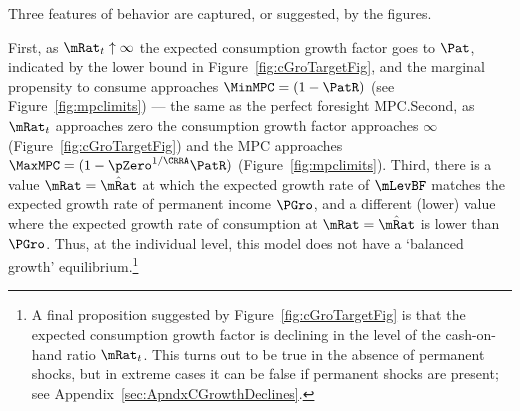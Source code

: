 \documentclass[BufferStockTheory]{subfiles}
\begin{document}
Three features of behavior are captured, or suggested, by the figures.

First, as $\mRat_{t} \uparrow \infty$ the expected consumption growth factor goes to ${\Pat}$, indicated by the lower bound in Figure~\ref{fig:cGroTargetFig}, and the marginal propensity to consume approaches $\MinMPC=(1-\PatR)$ (see Figure~\ref{fig:mpclimits}) --- the same as the perfect foresight MPC.\@  Second, as $\mRat_{t}$ approaches zero the consumption growth factor approaches $\infty$ (Figure~\ref{fig:cGroTargetFig}) and the MPC approaches $\MaxMPC=(1-\pZero^{1/\CRRA}\PatR)$ (Figure~\ref{fig:mpclimits}).  Third, there is a value $\mRat = \hat{\mRat}$ at which the expected growth rate of $\mLevBF$ matches the expected growth rate of permanent income $\PGro$, and a different (lower) value where the expected growth rate of consumption at $\mRat = \hat{\mRat}$ is lower than $\PGro$.  Thus, at the individual level, this model does not have a `balanced growth' equilibrium.\footnote{A final proposition suggested by Figure~\ref{fig:cGroTargetFig} is that the expected consumption growth factor is declining in the level of the cash-on-hand ratio $\mRat_{t}$.  This turns out to be true in the absence of permanent shocks, but in extreme cases it can be false if permanent shocks are present; see Appendix~\ref{sec:ApndxCGrowthDeclines}.}

\begin{comment}
  Third (Figure~\ref{fig:cGroTargetFig}), there are two special values of $\mRat$, which we will call the `individual balanced growth' point $\mStE$ because it is the point where expected consumption growth and expected permanent income growth are balanced, and the `individual target' $\mTrg$ such that if $\mRat_t = \mTrg$ then $\Ex_t [{\mRat}_{t+1}] = \mRat_t$.  %
  of permanent noncapital income.  (The individual consumer does not expect `balanced growth' at $\mTrg$).

  The final proposition suggested by Figure~\ref{fig:cGroTargetFig} is that the expected consumption growth factor is declining in the level of the cash-on-hand ratio $\mRat_{t}$.  This turns out to be true in the absence of permanent shocks, but in extreme cases it can be false if permanent shocks are present.\footnote{Throughout the remaining analysis I make a final assumption that is not strictly justified by the foregoing.  We have seen that the finite-horizon consumption functions $\usual{\cFunc}_{T-n}(\mRat)$ are twice continuously differentiable and strictly concave, and that they converge to a continuous function $\usual{\cFunc}(\mRat)$.  It does not strictly follow that the limiting function $\usual{\cFunc}(\mRat)$ is twice continuously differentiable, but I will assume that it is.}
\end{comment}
\end{document}
